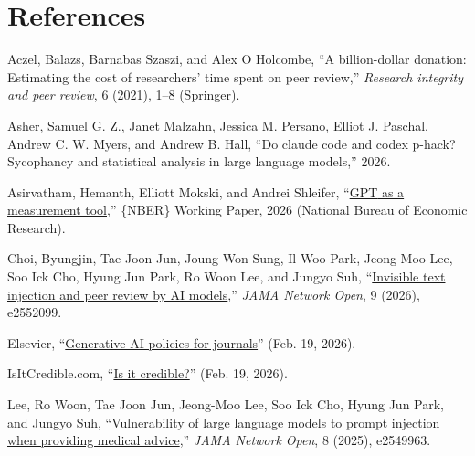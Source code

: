\documentclass[
  11pt,
  letterpaper,
]{article}
\newlength{\cslhangindent}
\newenvironment{CSLReferences}[2] %
 {\begin{list}{}{%
  \setlength{\itemindent}{0pt}
  \setlength{\leftmargin}{0pt}
  \setlength{\parsep}{0pt}
  \ifodd #1
   \setlength{\leftmargin}{\cslhangindent}
   \setlength{\itemindent}{-1\cslhangindent}
  \fi
  \setlength{\itemsep}{#2\baselineskip}}}
 {\end{list}}
\begin{document}
\normalsize


\section*{References}\label{references}


\label{refs}
\begin{CSLReferences}{1}{0}
Aczel, Balazs, Barnabas Szaszi, and Alex O Holcombe, {``A billion-dollar
donation: Estimating the cost of researchers' time spent on peer
review,''} \emph{Research integrity and peer review}, 6 (2021), 1--8
(Springer).

Asher, Samuel G. Z., Janet Malzahn, Jessica M. Persano, Elliot J.
Paschal, Andrew C. W. Myers, and Andrew B. Hall, {``Do claude code and
codex p-hack? {Sycophancy} and statistical analysis in large language
models,''} 2026.

Asirvatham, Hemanth, Elliott Mokski, and Andrei Shleifer,
{``\href{https://www.nber.org/papers/w34834}{{GPT} as a measurement
tool},''} \{NBER\} Working Paper, 2026 (National Bureau of Economic
Research).

Choi, Byungjin, Tae Joon Jun, Joung Won Sung, Il Woo Park, Jeong-Moo
Lee, Soo Ick Cho, Hyung Jun Park, Ro Woon Lee, and Jungyo Suh,
{``\href{https://doi.org/10.1001/jamanetworkopen.2025.52099}{Invisible
text injection and peer review by AI models},''} \emph{JAMA Network
Open}, 9 (2026), e2552099.

Elsevier,
{``\href{https://www.elsevier.com/about/policies-and-standards/generative-ai-policies-for-journals}{Generative
AI policies for journals}''} (Feb. 19, 2026).

IsItCredible.com, {``\href{https://www.isitcredible.com/}{Is it
credible?}''} (Feb. 19, 2026).

Lee, Ro Woon, Tae Joon Jun, Jeong-Moo Lee, Soo Ick Cho, Hyung Jun Park,
and Jungyo Suh,
{``\href{https://doi.org/10.1001/jamanetworkopen.2025.49963}{Vulnerability
of large language models to prompt injection when providing medical
advice},''} \emph{JAMA Network Open}, 8 (2025), e2549963.


\end{CSLReferences}
\end{document}
